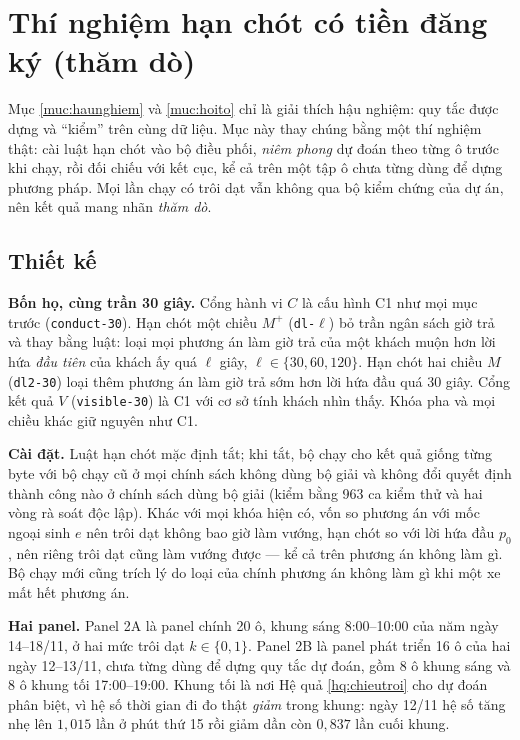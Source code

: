 \section{Thí nghiệm hạn chót có tiền đăng ký (thăm dò)}
\label{muc:tang2}

Mục \ref{muc:haunghiem} và \ref{muc:hoito} chỉ là giải thích hậu nghiệm: quy tắc được dựng và
``kiểm'' trên cùng dữ liệu. Mục này thay chúng bằng một thí nghiệm thật: cài luật hạn chót vào bộ
điều phối, \emph{niêm phong} dự đoán theo từng ô trước khi chạy, rồi đối chiếu với kết cục, kể cả
trên một tập ô chưa từng dùng để dựng phương pháp. Mọi lần chạy có trôi dạt vẫn không qua bộ kiểm
chứng của dự án, nên kết quả mang nhãn \emph{thăm dò}.

\subsection{Thiết kế}

\textbf{Bốn họ, cùng trần 30 giây.} Cổng hành vi $C$ là cấu hình C1 như mọi mục trước
(\texttt{conduct-30}). Hạn chót một chiều $M^{+}$ (\texttt{dl-}$\ell$) bỏ trần ngân sách giờ trả và
thay bằng luật: loại mọi phương án làm giờ trả của một khách muộn hơn lời hứa \emph{đầu tiên} của
khách ấy quá $\ell$ giây, $\ell \in \{30, 60, 120\}$. Hạn chót hai chiều $M$ (\texttt{dl2-30}) loại
thêm phương án làm giờ trả sớm hơn lời hứa đầu quá 30 giây. Cổng kết quả $V$ (\texttt{visible-30})
là C1 với cơ sở tính khách nhìn thấy. Khóa pha và mọi chiều khác giữ nguyên như C1.

\textbf{Cài đặt.} Luật hạn chót mặc định tắt; khi tắt, bộ chạy cho kết quả giống từng byte với bộ
chạy cũ ở mọi chính sách không dùng bộ giải và không đổi quyết định thành công nào ở chính sách dùng
bộ giải (kiểm bằng 963 ca kiểm thử và hai vòng rà soát độc lập). Khác với mọi khóa hiện có, vốn so
phương án với mốc ngoại sinh $e$ nên trôi dạt không bao giờ làm vướng, hạn chót so với lời hứa đầu
$p_0$, nên riêng trôi dạt cũng làm vướng được --- kể cả trên phương án không làm gì. Bộ chạy mới cũng
trích lý do loại của chính phương án không làm gì khi một xe mất hết phương án.

\textbf{Hai panel.} Panel 2A là panel chính 20 ô, khung sáng 8:00--10:00 của năm ngày 14--18/11, ở
hai mức trôi dạt $k \in \{0, 1\}$. Panel 2B là panel phát triển 16 ô của hai ngày 12--13/11, chưa
từng dùng để dựng quy tắc dự đoán, gồm 8 ô khung sáng và 8 ô khung tối 17:00--19:00. Khung tối là
nơi Hệ quả \ref{hq:chieutroi} cho dự đoán phân biệt, vì hệ số thời gian đi đo thật \emph{giảm}
trong khung: ngày 12/11 hệ số tăng nhẹ lên $1{,}015$ lần ở phút thứ 15 rồi giảm dần còn $0{,}837$ lần
cuối khung.

